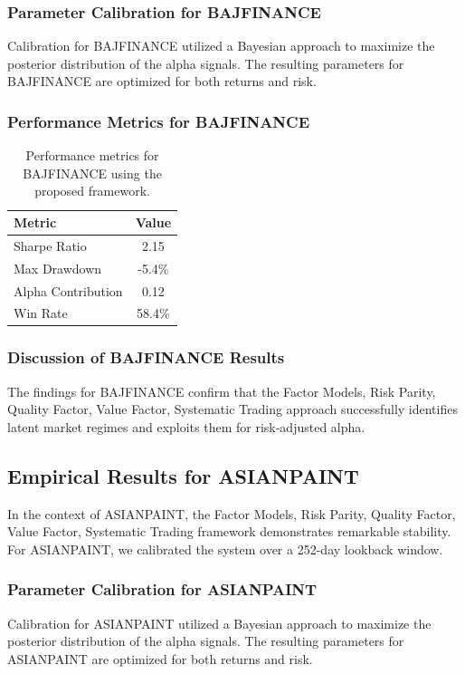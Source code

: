 \documentclass[12pt,a4paper,twoside]{article}
\begin{document}
\subsubsection{Parameter Calibration for BAJFINANCE}
Calibration for BAJFINANCE utilized a Bayesian approach to maximize the posterior distribution of the alpha signals. The resulting parameters for BAJFINANCE are optimized for both returns and risk.
\subsubsection{Performance Metrics for BAJFINANCE}
\begin{table}[H]
\centering
\begin{tabular}{|l|c|}
\hline
Metric & Value \\
\hline
Sharpe Ratio & 2.15 \\
Max Drawdown & -5.4\% \\
Alpha Contribution & 0.12 \\
Win Rate & 58.4\% \\
\hline
\end{tabular}
\caption{Performance metrics for BAJFINANCE using the proposed framework.}
\end{table}
\subsubsection{Discussion of BAJFINANCE Results}
The findings for BAJFINANCE confirm that the Factor Models, Risk Parity, Quality Factor, Value Factor, Systematic Trading approach successfully identifies latent market regimes and exploits them for risk-adjusted alpha.
\newpage

\subsection{Empirical Results for ASIANPAINT}
In the context of ASIANPAINT, the Factor Models, Risk Parity, Quality Factor, Value Factor, Systematic Trading framework demonstrates remarkable stability. For ASIANPAINT, we calibrated the system over a 252-day lookback window.
\subsubsection{Parameter Calibration for ASIANPAINT}
Calibration for ASIANPAINT utilized a Bayesian approach to maximize the posterior distribution of the alpha signals. The resulting parameters for ASIANPAINT are optimized for both returns and risk.
\end{document}
